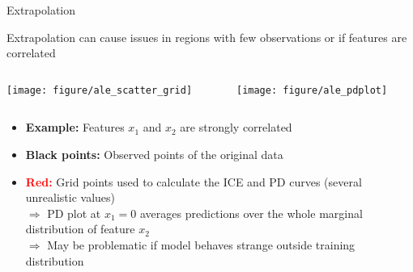 \documentclass[10pt,compress,t,notes=noshow, xcolor=table]{beamer}
\begin{document}
\begin{frame}{Extrapolation}


Extrapolation can cause issues in regions with few observations or if features are correlated
 
\begin{columns}[T]
\begin{column}{0.5\textwidth}
\centering
\texttt{[image: figure/ale\_scatter\_grid]}
\end{column}
\begin{column}{0.5\textwidth}
\centering
\texttt{[image: figure/ale\_pdplot]}
\end{column}
\end{columns}

\begin{itemize}
\item \textbf{Example:} Features $x_1$ and $x_2$ are strongly correlated
\item \textbf{Black points:} Observed points of the original data
\item \textbf{\textcolor{red}{Red:}} Grid points used to calculate the ICE and PD curves (several unrealistic values)\\ %
$\Rightarrow$ %
PD plot at $x_1=0$ averages predictions over the whole marginal distribution of feature $x_2$\\
$\Rightarrow$ May be problematic if model behaves strange outside training distribution
\end{itemize}

%
%
%
%
\end{frame}
\end{document}
